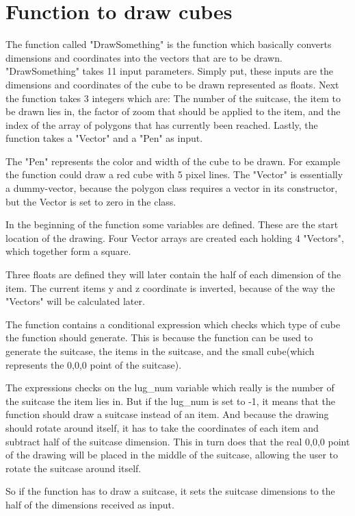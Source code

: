 \section{Function to draw cubes}
The function called "DrawSomething" is the function which basically converts dimensions and coordinates into the vectors that are to be drawn.
"DrawSomething" takes 11 input parameters. Simply put, these inputs are the dimensions and coordinates of the cube to be drawn represented as floats. Next the function takes 3 integers which are: The number of the suitcase, the item to be drawn lies in, the factor of zoom that should be applied to the item, and the index of the array of polygons that has currently been reached. Lastly, the function takes a "Vector" and a "Pen" as input.

The "Pen" represents the color and width of the cube to be drawn. For example the function could draw a red cube with 5 pixel lines. The "Vector" is essentially a dummy-vector, because the polygon class requires a vector in its constructor, but the Vector is set to zero in the class.

In the beginning of the function some variables are defined. These are the start location of the drawing. Four Vector arrays are created each holding 4 "Vectors", which together form a square.

Three floats are defined they will later contain the half of each dimension of the item.
The current items y and z coordinate is inverted, because of the way the "Vectors" will be calculated later. 

The function contains a conditional expression which checks which type of cube the function should generate. This is because the function can be used to generate the suitcase, the items in the suitcase, and the small cube(which represents the 0,0,0 point of the suitcase). 

The expressions checks on the lug\_num variable which really is the number of the suitcase the item lies in. But if the lug\_num is set to -1, it means that the function should draw a suitcase instead of an item. And because the drawing should rotate around itself, it has to take the coordinates of each item and subtract half of the suitcase dimension. This in turn does that the real 0,0,0 point of the drawing will be placed in the middle of the suitcase, allowing the user to rotate the suitcase around itself.

So if the function has to draw a suitcase, it sets the suitcase dimensions to the half of the dimensions received as input.

